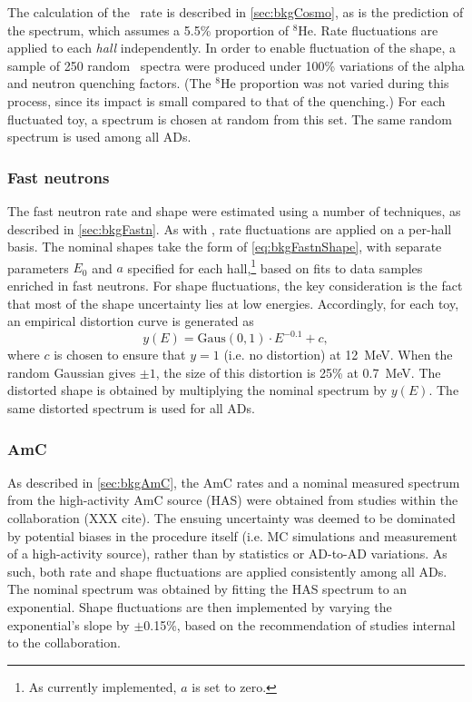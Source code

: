 \documentclass[../thesis.tex]{subfiles}
\begin{document}
The calculation of the \LiHe\ rate is described in \autoref{sec:bkgCosmo}, as is
the prediction of the spectrum, which assumes a 5.5\% proportion of $^8$He. Rate
fluctuations are applied to each \emph{hall} independently. In order to enable
fluctuation of the shape, a sample of 250 random \LiHe\ spectra were produced
under 100\% variations of the alpha and neutron quenching factors. (The $^8$He
proportion was not varied during this process, since its impact is small
compared to that of the quenching.) For each fluctuated toy, a spectrum is
chosen at random from this set. The same random spectrum is used among all ADs.

\subsubsection{Fast neutrons}

The fast neutron rate and shape were estimated using a number of techniques, as
described in \autoref{sec:bkgFastn}. As with \LiHe, rate fluctuations are
applied on a per-hall basis. The nominal shapes take the form of
\autoref{eq:bkgFastnShape}, with separate parameters $E_0$ and $a$ specified for
each hall,\footnote{As currently implemented, $a$ is set to zero.} based on fits
to data samples enriched in fast neutrons. For shape fluctuations, the key
consideration is the fact that most of the shape uncertainty lies at low
energies. Accordingly, for each toy, an empirical distortion curve is generated
as
\begin{equation*}
  y(E) = \mathrm{Gaus}(0,1) \cdot E^{-0.1} + c,
\end{equation*}
where $c$ is chosen to ensure that $y = 1$ (i.e. no distortion) at 12~MeV. When
the random Gaussian gives $\pm 1$, the size of this distortion is 25\% at
0.7~MeV. The distorted shape is obtained by multiplying the nominal spectrum by
$y(E)$. The same distorted spectrum is used for all ADs.

\subsubsection{AmC}

As described in \autoref{sec:bkgAmC}, the AmC rates and a nominal measured
spectrum from the high-activity AmC source (HAS) were obtained from studies
within the collaboration (XXX cite). The ensuing uncertainty was deemed to be
dominated by potential biases in the procedure itself (i.e. MC simulations and
measurement of a high-activity source), rather than by statistics or AD-to-AD
variations. As such, both rate and shape fluctuations are applied consistently
among all ADs. The nominal spectrum was obtained by fitting the HAS spectrum to
an exponential. Shape fluctuations are then implemented by varying the
exponential's slope by $\pm$0.15\%, based on the recommendation of studies
internal to the collaboration.
\end{document}
